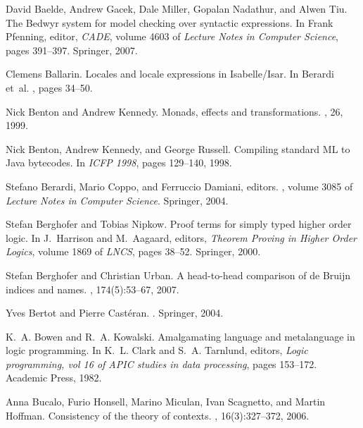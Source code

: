 \documentclass[final]{svjour3}
\begin{document}
\begin{thebibliography}{100}
David Baelde, Andrew Gacek, Dale Miller, Gopalan Nadathur, and Alwen Tiu.
\newblock The {B}edwyr system for model checking over syntactic expressions.
\newblock In Frank Pfenning, editor, {\em CADE}, volume 4603 of {\em Lecture
  Notes in Computer Science}, pages 391--397. Springer, 2007.

Clemens Ballarin.
\newblock Locales and locale expressions in {I}sabelle/{I}sar.
\newblock In Berardi et~al. \cite{DBLP:conf/types/2003}, pages 34--50.

Nick Benton and Andrew Kennedy.
\newblock Monads, effects and transformations.
, 26, 1999.

Nick Benton, Andrew Kennedy, and George Russell.
\newblock Compiling standard {ML} to {J}ava bytecodes.
\newblock In {\em ICFP 1998}, pages 129--140, 1998.

Stefano Berardi, Mario Coppo, and Ferruccio Damiani, editors.
, volume
  3085 of {\em Lecture Notes in Computer Science}. Springer, 2004.

Stefan Berghofer and Tobias Nipkow.
\newblock Proof terms for simply typed higher order logic.
\newblock In J.~Harrison and M.~Aagaard, editors, {\em Theorem Proving in
  Higher Order Logics}, volume 1869 of {\em LNCS}, pages 38--52. Springer,
  2000.

Stefan Berghofer and Christian Urban.
\newblock A head-to-head comparison of de {B}ruijn indices and names.
, 174(5):53--67, 2007.

Yves Bertot and Pierre Cast\'{e}ran.
.
\newblock Springer, 2004.

K.~A. Bowen and R.~A. Kowalski.
\newblock Amalgamating language and metalanguage in logic programming.
\newblock In K.~L. Clark and S.~A. Tarnlund, editors, {\em Logic programming,
  vol 16 of APIC studies in data processing}, pages 153--172. Academic Press,
  1982.

Anna Bucalo, Furio Honsell, Marino Miculan, Ivan Scagnetto, and Martin Hoffman.
\newblock Consistency of the theory of contexts.
, 16(3):327--372, 2006.


\end{thebibliography}
\end{document}
